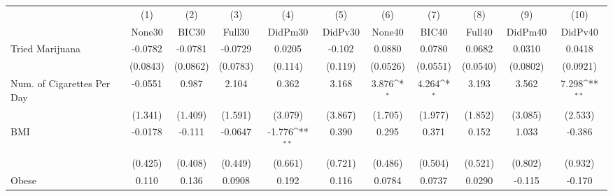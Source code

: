 {
\def\sym#1{\ifmmode^{#1}\else\(^{#1}\)\fi}
\begin{tabular}{l*{10}{c}}
\toprule
            &\multicolumn{1}{c}{(1)}&\multicolumn{1}{c}{(2)}&\multicolumn{1}{c}{(3)}&\multicolumn{1}{c}{(4)}&\multicolumn{1}{c}{(5)}&\multicolumn{1}{c}{(6)}&\multicolumn{1}{c}{(7)}&\multicolumn{1}{c}{(8)}&\multicolumn{1}{c}{(9)}&\multicolumn{1}{c}{(10)}\\
            &\multicolumn{1}{c}{None30}&\multicolumn{1}{c}{BIC30}&\multicolumn{1}{c}{Full30}&\multicolumn{1}{c}{DidPm30}&\multicolumn{1}{c}{DidPv30}&\multicolumn{1}{c}{None40}&\multicolumn{1}{c}{BIC40}&\multicolumn{1}{c}{Full40}&\multicolumn{1}{c}{DidPm40}&\multicolumn{1}{c}{DidPv40}\\
\midrule
Tried Marijuana&     -0.0782         &     -0.0781         &     -0.0729         &      0.0205         &      -0.102         &      0.0880         &      0.0780         &      0.0682         &      0.0310         &      0.0418         \\
            &    (0.0843)         &    (0.0862)         &    (0.0783)         &     (0.114)         &     (0.119)         &    (0.0526)         &    (0.0551)         &    (0.0540)         &    (0.0802)         &    (0.0921)         \\
\addlinespace
Num. of Cigarettes Per Day&     -0.0551         &       0.987         &       2.104         &       0.362         &       3.168         &       3.876\sym{*}  &       4.264\sym{*}  &       3.193         &       3.562         &       7.298\sym{**} \\
            &     (1.341)         &     (1.409)         &     (1.591)         &     (3.079)         &     (3.867)         &     (1.705)         &     (1.977)         &     (1.852)         &     (3.085)         &     (2.533)         \\
\addlinespace
BMI         &     -0.0178         &      -0.111         &     -0.0647         &      -1.776\sym{**} &       0.390         &       0.295         &       0.371         &       0.152         &       1.033         &      -0.386         \\
            &     (0.425)         &     (0.408)         &     (0.449)         &     (0.661)         &     (0.721)         &     (0.486)         &     (0.504)         &     (0.521)         &     (0.802)         &     (0.932)         \\
\addlinespace
Obese       &       0.110         &       0.136         &      0.0908         &       0.192         &       0.116         &      0.0784         &      0.0737         &      0.0290         &      -0.115         &      -0.170         \\

\end{tabular}}
